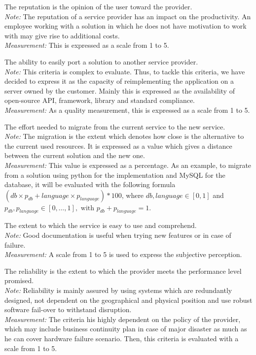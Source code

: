 \documentclass[a4paper,11pt]{article}
\begin{document}
\begin{description}[parsep=1pt,listparindent=\parindent,labelindent=\parindent,font=$\bullet$\ ]
  \item[Reputation:] The reputation is the opinion of the user toward the provider.\\
    \emph{Note:} The reputation of a service provider has an impact on the productivity. An employee working with a solution in which he does not have motivation to work with may give rise to additional costs.\\
    \emph{Measurement:} This is expressed as a scale from 1 to 5.
    
  \item[Portability:] The ability to easily port a solution to another service provider.\\
    \emph{Note:} This criteria is complex to evaluate. Thus, to tackle this criteria, we have decided to express it as the capacity of reimplementing the application on a server owned by the customer. Mainly this is expressed as the availability of open-source API, framework, library and standard compliance.\\
    \emph{Measurement:} As a quality measurement, this is expressed as a scale from 1 to 5.

  \item[Migration:] The effort needed to migrate from the current service to the new service.\\
    \emph{Note:} The migration is the extent which denotes how close is the alternative to the current used resources. It is expressed as a value which gives a distance between the current solution and the new one.\\
    \emph{Measurement:} This value is expressed as a percentage. As an example, to migrate from a solution using python for the implementation and MySQL for the database, it will be evaluated with the following formula $( db \times p_{db} + language \times p_{language})  * 100 $, where $ db, language \in [ 0,1 ] $ and $ p_{db}, p_{language} \in [ 0, \ldots, 1 ], \text{ with } p_{db} + p_{language} = 1$. 

  \item[Usability:] The extent to which the service is easy to use and comprehend.\\
    \emph{Note:} Good documentation is useful when trying new features or in case of failure.\\
    \emph{Measurement:} A scale from 1 to 5 is used to express the subjective perception.

  \item[Reliability:] The reliability is the extent to which the provider meets the performance level promised.\\
    \emph{Note:} Reliability is mainly assured by using systems which are redundantly designed, not dependent on the geographical and physical position and use robust software fail-over to withstand disruption.\\
    \emph{Measurement:} The criteria his highly dependent on the policy of the provider, which may include business continuity plan in case of major disaster as much as he can cover hardware failure scenario. Then, this criteria is evaluated with a scale from 1 to 5.


\end{description}
\end{document}
